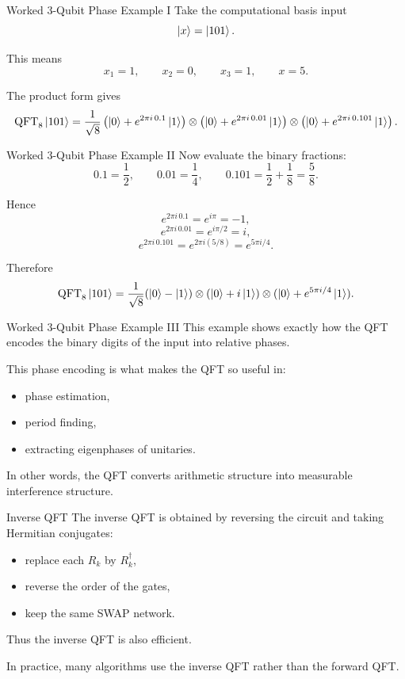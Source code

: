 \documentclass{beamer}
\begin{document}
\begin{frame}{Worked 3-Qubit Phase Example I}
Take the computational basis input
\[
\ket{x}=\ket{101}.
\]

This means
\[
x_1=1,\qquad x_2=0,\qquad x_3=1,
\qquad x=5.
\]

The product form gives
\[
\operatorname{QFT}_8 \ket{101}
=
\frac{1}{\sqrt8}
\left(\ket0 + e^{2\pi i\,0.1}\ket1\right)
\otimes
\left(\ket0 + e^{2\pi i\,0.01}\ket1\right)
\otimes
\left(\ket0 + e^{2\pi i\,0.101}\ket1\right).
\]
\end{frame}

\begin{frame}{Worked 3-Qubit Phase Example II}
Now evaluate the binary fractions:
\[
0.1 = \frac12,
\qquad
0.01 = \frac14,
\qquad
0.101 = \frac12 + \frac18 = \frac58.
\]

Hence
\[
e^{2\pi i\,0.1} = e^{i\pi} = -1,
\]
\[
e^{2\pi i\,0.01} = e^{i\pi/2} = i,
\]
\[
e^{2\pi i\,0.101} = e^{2\pi i(5/8)} = e^{5\pi i/4}.
\]

Therefore
\[
\operatorname{QFT}_8 \ket{101}
=
\frac{1}{\sqrt8}
(\ket0-\ket1)\otimes(\ket0+i\ket1)\otimes(\ket0+e^{5\pi i/4}\ket1).
\]
\end{frame}

\begin{frame}{Worked 3-Qubit Phase Example III}
This example shows exactly how the QFT encodes the binary digits of the input into relative phases.

This phase encoding is what makes the QFT so useful in:
\begin{itemize}
\item phase estimation,
\item period finding,
\item extracting eigenphases of unitaries.
\end{itemize}

In other words, the QFT converts arithmetic structure into measurable interference structure.
\end{frame}

\begin{frame}{Inverse QFT}
The inverse QFT is obtained by reversing the circuit and taking Hermitian conjugates:
\begin{itemize}
\item replace each \(R_k\) by \(R_k^\dagger\),
\item reverse the order of the gates,
\item keep the same SWAP network.
\end{itemize}

Thus the inverse QFT is also efficient.

In practice, many algorithms use the inverse QFT rather than the forward QFT.
\end{frame}
\end{document}
